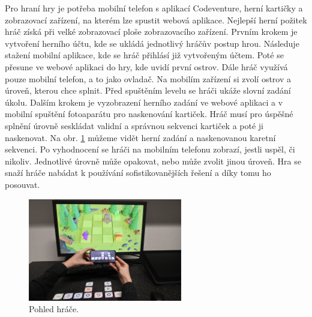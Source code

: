 Pro hraní hry je potřeba mobilní telefon s aplikací Codeventure, herní kartičky a zobrazovací zařízení, na kterém lze spustit webová aplikace. Nejlepší herní požitek hráč získá při velké zobrazovací ploše zobrazovacího zařízení. Prvním krokem je vytvoření herního účtu, kde se ukládá jednotlivý hráčův postup hrou. Následuje stažení mobilní aplikace, kde se hráč přihlásí již vytvořeným účtem. Poté se přesune ve webové aplikaci do hry, kde uvidí první ostrov. Dále hráč využívá pouze mobilní telefon, a to jako ovladač. Na mobilím zařízení si zvolí ostrov a úroveň, kterou chce splnit. Před spuštěním levelu se hráči ukáže slovní zadání úkolu. Dalším krokem je vyzobrazení herního zadání ve webové aplikaci a v mobilní spuštění fotoaparátu pro naskenování kartiček. Hráč musí pro úspěšné splnění úrovně seskládat validní a správnou sekvenci kartiček a poté ji naskenovat. Na obr. \ref{fig:pohled-hrace} můžeme vidět herní zadání a naskenovanou karetní sekvenci. Po vyhodnocení se hráči na mobilním telefonu zobrazí, jestli uspěl, či nikoliv. Jednotlivé úrovně může opakovat, nebo může zvolit jinou úroveň. Hra se snaží hráče nabádat k používání sofistikovanějších řešení a díky tomu ho posouvat. 

\begin{figure}[h]
    \centering
    \includegraphics[width=0.6\textwidth]{img/pohled-hrace.png}
    \caption{Pohled hráče.}
    \label{fig:pohled-hrace}
\end{figure}